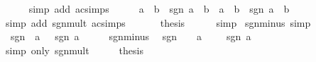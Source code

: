 \begin{isabellebody}
\ \ \ \ \isamarkupfalse%
\ {\isacharparenleft}{\kern0pt}simp\ add{\isacharcolon}{\kern0pt}\ ac{\isacharunderscore}{\kern0pt}simps{\isacharparenright}{\kern0pt}\isanewline
\ \ \isamarkupfalse%
\ \isamarkupfalse%
\ {\isachardoublequoteopen}{\isasymbar}a\ {\isacharasterisk}{\kern0pt}\ b{\isasymbar}\ {\isacharasterisk}{\kern0pt}\ sgn\ {\isacharparenleft}{\kern0pt}a\ {\isacharasterisk}{\kern0pt}\ b{\isacharparenright}{\kern0pt}\ {\isacharequal}{\kern0pt}\ {\isasymbar}a{\isasymbar}\ {\isacharasterisk}{\kern0pt}\ {\isasymbar}b{\isasymbar}\ {\isacharasterisk}{\kern0pt}\ sgn\ {\isacharparenleft}{\kern0pt}a\ {\isacharasterisk}{\kern0pt}\ b{\isacharparenright}{\kern0pt}{\isachardoublequoteclose}\isanewline
\ \ \ \ \isamarkupfalse%
\ {\isacharparenleft}{\kern0pt}simp\ add{\isacharcolon}{\kern0pt}\ sgn{\isacharunderscore}{\kern0pt}mult\ ac{\isacharunderscore}{\kern0pt}simps{\isacharparenright}{\kern0pt}\isanewline
\ \ \isamarkupfalse%
\ {\isacharasterisk}{\kern0pt}\ \isamarkupfalse%
\ {\isacharquery}{\kern0pt}thesis\isanewline
\ \ \ \ \isamarkupfalse%
\ simp\isanewline
{}\isamarkupfalse%
%
\endisatagproof
{\isafoldproof}%
%
\isadelimproof
\isanewline
%
\endisadelimproof
\isanewline
{}\isamarkupfalse%
\ sgn{\isacharunderscore}{\kern0pt}minus\ {\isacharbrackleft}{\kern0pt}simp{\isacharbrackright}{\kern0pt}{\isacharcolon}{\kern0pt}\isanewline
\ \ {\isachardoublequoteopen}sgn\ {\isacharparenleft}{\kern0pt}{\isacharminus}{\kern0pt}\ a{\isacharparenright}{\kern0pt}\ {\isacharequal}{\kern0pt}\ {\isacharminus}{\kern0pt}\ sgn\ a{\isachardoublequoteclose}\isanewline
%
\isadelimproof
%
\endisadelimproof
%
\isatagproof
{}\isamarkupfalse%
\ {\isacharminus}{\kern0pt}\isanewline
\ \ \isamarkupfalse%
\ sgn{\isacharunderscore}{\kern0pt}minus{\isacharunderscore}{\kern0pt}{}\ \isamarkupfalse%
\ {\isachardoublequoteopen}sgn\ {\isacharparenleft}{\kern0pt}{\isacharminus}{\kern0pt}\ {}\ {\isacharasterisk}{\kern0pt}\ a{\isacharparenright}{\kern0pt}\ {\isacharequal}{\kern0pt}\ {\isacharminus}{\kern0pt}\ {}\ {\isacharasterisk}{\kern0pt}\ sgn\ a{\isachardoublequoteclose}\isanewline
\ \ \ \ \isamarkupfalse%
\ {\isacharparenleft}{\kern0pt}simp\ only{\isacharcolon}{\kern0pt}\ sgn{\isacharunderscore}{\kern0pt}mult{\isacharparenright}{\kern0pt}\isanewline
\ \ \isamarkupfalse%
\ \isamarkupfalse%
\ {\isacharquery}{\kern0pt}thesis\isanewline

\end{isabellebody}
